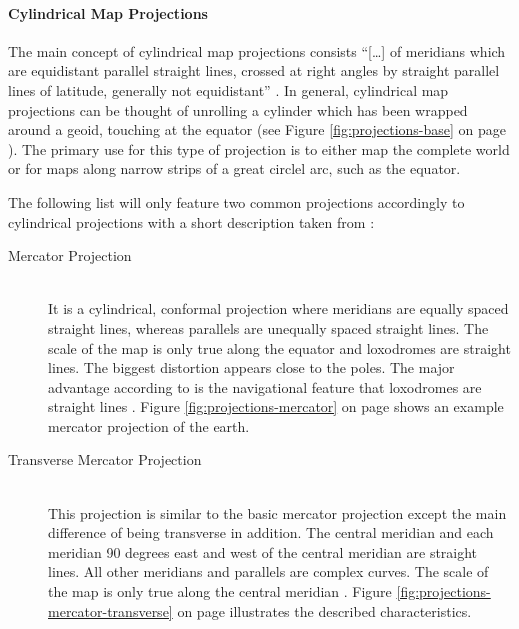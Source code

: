 \paragraph{Cylindrical Map Projections}
The main concept of cylindrical map projections consists ``[\ldots] of meridians which are equidistant parallel straight lines, crossed at right angles by straight parallel lines of latitude, generally not equidistant'' .
In general, cylindrical map projections can be thought of unrolling a cylinder which has been wrapped around a geoid, touching at the equator (see Figure \ref{fig:projections-base} on page \pageref{fig:projections-base}).
The primary use for this type of projection is to either map the complete world or for maps along narrow strips of a great circlel arc, such as the equator.

The following list will only feature two common projections accordingly to cylindrical projections with a short description taken from \citeauthor{Snyder1987} :

\begin{description}

\item[Mercator Projection] \hfill \\
It is a cylindrical, conformal projection where meridians are equally spaced straight lines, whereas parallels are unequally spaced straight lines. The scale of the map is only true along the equator and loxodromes are straight lines. The biggest distortion appears close to the poles. The major advantage according to \citeauthor{Snyder1987} is the navigational feature that loxodromes are straight lines . Figure \ref{fig:projections-mercator} on page \pageref{fig:projections-mercator} shows an example mercator projection of the earth.

\newpage
\item[Transverse Mercator Projection] \hfill \\
This projection is similar to the basic mercator projection except the main difference of being transverse in addition. The central meridian and each meridian 90 degrees east and west of the central meridian are straight lines. All other meridians and parallels are complex curves. The scale of the map is only true along the central meridian . Figure \ref{fig:projections-mercator-transverse} on page \pageref{fig:projections-mercator-transverse} illustrates the described characteristics.

\end{description}

